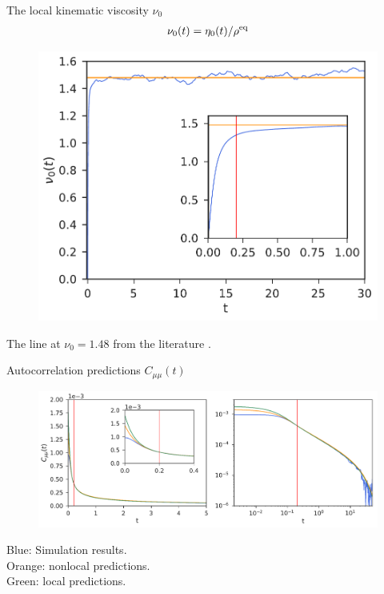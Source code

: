 \documentclass{beamer}
\begin{document}
\begin{frame}{The local kinematic viscosity $\nu_0$}
  \begin{align}
    \nu_0(t)=\eta_0(t)/\rho^{\rm eq}
    \nonumber
  \end{align}
\begin{figure}[h!]
\includegraphics[scale=0.41]{KinVisc0t-PBC}
\end{figure}
The line at $\nu_0=1.48$ from the literature \cite{Woodcock2006}.
\end{frame}

\begin{frame}{Autocorrelation predictions $C_{\mu\mu}(t)$}
\begin{figure}[h!]
\includegraphics[width=\linewidth]{Predictionsmumu-PBC}
\end{figure}
{\color{blue} Blue}: Simulation results. \\
{\color{orange} Orange}: nonlocal predictions.\\ 
{\color{green} Green}: local predictions.\\
\end{frame}
\end{document}
